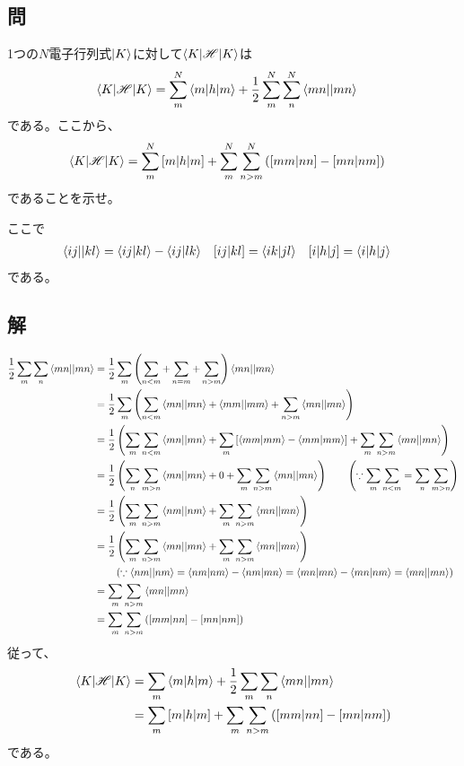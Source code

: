 \subsection{問}
1つの$N$電子行列式$\ket{K}$に対して$\braket{K|{\mathscr{H}}|K}$は
\begin{align}
	\braket{K|{\mathscr{H}}|K}
&=
	\sum_{m}^{N} \braket{m|h|m}
	+
	\frac{1}{2}
	\sum_{m}^{N} \sum_{n}^{N} {\braket{mn||mn}}
\end{align}
である。ここから、
\begin{align}
	\braket{K|{\mathscr{H}}|K}
&=
	\sum_{m}^{N} {[m|h|m]}
	+
	\sum_{m}^{N} \sum_{n>m}^{N}\left(
		{[mm|nn]}
		-
		{[mn|nm]}
	\right)
\end{align}
であることを示せ。

ここで
\begin{align}
	\antitwo{ij}{kl}
&=
	\phystwo{ij}{kl}
	-
	\phystwo{ij}{lk} &
%
%
	\chemtwo{ij}{kl}
&=
	\phystwo{ik}{jl} &
%
%
	\chemone{i}{h}{j}
&=
	\braket{i|h|j}
\end{align}
である。


\subsection{解}
\begin{align}
	\frac{1}{2}
	\sum_m \sum_n \antitwo{mn}{mn}
&=
	\frac{1}{2}
	\sum_m
	\left(
		\sum_{n<m}
		+
		\sum_{n=m}
		+
		\sum_{n>m}
	\right) \antitwo{mn}{mn} \\
%
%
&=
	\frac{1}{2}
	\sum_m
	\left(
		\sum_{n<m} \antitwo{mn}{mn}
		+
		\antitwo{mm}{mm}
		+
		\sum_{n>m} \antitwo{mn}{mn}
	\right) \\
%
%
&=
	\frac{1}{2}
	\left(
		\sum_m \sum_{n<m} \antitwo{mn}{mn}
		+
		\sum_m
		\left[
			\phystwo{mm}{mm}
			-
			\phystwo{mm}{mm}
		\right]
		+
		\sum_m \sum_{n>m} \antitwo{mn}{mn}
	\right) \\
%
%
&=
	\frac{1}{2}
	\left(
		\sum_n \sum_{m>n} \antitwo{mn}{mn}
		+
		0
		+
		\sum_m \sum_{n>m} \antitwo{mn}{mn}
	\right)
	\qquad
	\left(
		\because
		\sum_m \sum_{n<m} = \sum_n \sum_{m>n}
	\right) \\
%
%
&=
	\frac{1}{2}
	\left(
		\sum_m \sum_{n>m} \antitwo{nm}{nm}
		+
		\sum_m \sum_{n>m} \antitwo{mn}{mn}
	\right) \\
%
%
&=
	\frac{1}{2}
	\left(
		\sum_m \sum_{n>m} \antitwo{mn}{mn}
		+
		\sum_m \sum_{n>m} \antitwo{mn}{mn}
	\right) \nonumber \\ &
	\qquad
	\left(
		\because
		\antitwo{nm}{nm}
		=
		\phystwo{nm}{nm} -\phystwo{nm}{mn}
		=
		\phystwo{mn}{mn} -\phystwo{mn}{nm}
		=
		\antitwo{mn}{mn}
	\right) \\
%
%
&=
	\sum_m \sum_{n>m} \antitwo{mn}{mn} \\
%
%
&=
	\sum_m \sum_{n>m}
	\left(
		\chemtwo{mm}{nn}
		-
		\chemtwo{mn}{nm}
	\right)
\end{align}
従って、
\begin{align}
	\braket{K|\H|K}
&=
	\sum_{m} \braket{m|h|m}
	+
	\frac{1}{2}
	\sum_{m} \sum_{n} \antitwo{mn}{mn} \\
%
%
&=
	\sum_m \chemone{m}{h}{m}
	+
	\sum_m \sum_{n>m}
	\left(
		\chemtwo{mm}{nn}
		-
		\chemtwo{mn}{nm}
	\right)
\end{align}
である。
